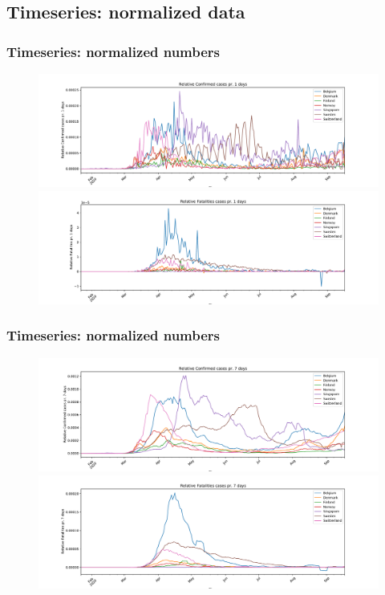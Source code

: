 \documentclass{beamer}
\begin{document}
\subsection{Timeseries: normalized data}
\begin{frame}
\frametitle{Timeseries: normalized numbers}
\begin{figure}[H]
\includegraphics[width=\textwidth]{../figs/confirmed_rate_timeseries_relative_1days_linear.pdf}
\includegraphics[width=\textwidth]{../figs/deaths_rate_timeseries_relative_1days_linear.pdf}
\end{figure}
\end{frame}
\begin{frame}
\frametitle{Timeseries: normalized numbers}
\begin{figure}[H]
\includegraphics[width=\textwidth]{../figs/confirmed_rate_timeseries_relative_7days_linear.pdf}
\includegraphics[width=\textwidth]{../figs/deaths_rate_timeseries_relative_7days_linear.pdf}
\end{figure}
\end{frame}
\end{document}

